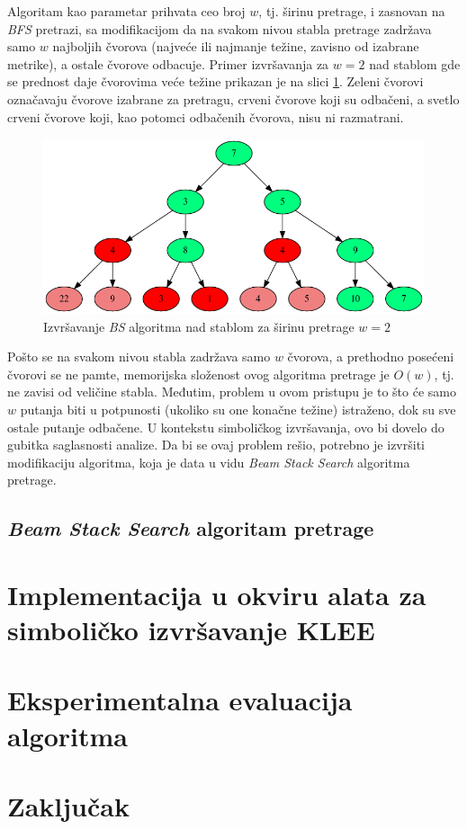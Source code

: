 \documentclass[a4paper]{article}
\begin{document}
Algoritam kao parametar prihvata ceo broj $w$, tj. širinu pretrage, i zasnovan na \textit{BFS} pretrazi, sa modifikacijom da na svakom nivou stabla pretrage zadržava samo $w$ najboljih čvorova (najveće ili najmanje težine, zavisno od izabrane metrike), a ostale čvorove odbacuje. Primer izvršavanja za $w = 2$ nad stablom gde se prednost daje čvorovima veće težine prikazan je na slici \ref{fig:beam_search}. Zeleni čvorovi označavaju čvorove izabrane za pretragu, crveni čvorove koji su odbačeni, a svetlo crveni čvorove koji, kao potomci odbačenih čvorova, nisu ni razmatrani.

\begin{figure}[h!]
    \centering
    \includegraphics[width=\linewidth]{ilustracije/beam_search_primer.png}
    \caption{Izvršavanje \textit{BS} algoritma nad stablom za širinu pretrage $w = 2$}
    \label{fig:beam_search}
\end{figure}

Pošto se na svakom nivou stabla zadržava samo $w$ čvorova, a prethodno posećeni čvorovi se ne pamte, memorijska složenost ovog algoritma pretrage je $O(w)$, tj. ne zavisi od veličine stabla. Međutim, problem u ovom pristupu je to što će samo $w$ putanja biti u potpunosti (ukoliko su one konačne težine) istraženo, dok su sve ostale putanje odbačene. U kontekstu simboličkog izvršavanja, ovo bi dovelo do gubitka saglasnosti analize. Da bi se ovaj problem rešio, potrebno je izvršiti modifikaciju algoritma, koja je data u vidu \textit{Beam Stack Search} algoritma pretrage.

\subsection{\textit{Beam Stack Search} algoritam pretrage}

\section{Implementacija u okviru alata za simboličko izvršavanje KLEE}

\section{Eksperimentalna evaluacija algoritma}

\section{Zaključak}

\appendix


\end{document}
